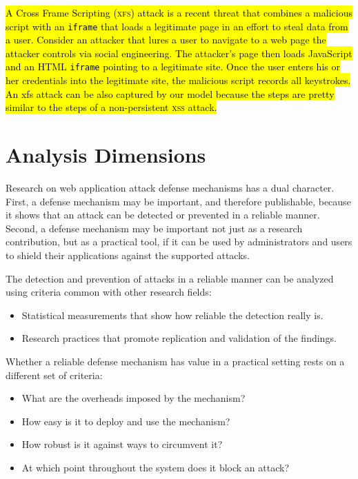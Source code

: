 \documentclass[10pt,journal,compsoc]{IEEEtran}
\newcommand{\hlc}[2][yellow]{ {\sethlcolor{#1} \hl{#2}} }
\begin{document}
\hlc[yellow]{A Cross Frame Scripting (\textsc{xfs})
attack is a recent threat that combines
a malicious script with
an {\tt iframe} that loads a legitimate page in
an effort to steal data from a user.
Consider an attacker that lures
a user to navigate to a web page the attacker controls
via social engineering.
The attacker's page then loads JavaScript
and an HTML {\tt iframe} pointing to a legitimate site.
Once the user enters his or her
credentials into the legitimate site,
the malicious script records all keystrokes.
An {\sc xfs} attack can be also captured by our model
because the steps are pretty similar to the steps of
a non-persistent \textsc{xss} attack.}

\section{Analysis Dimensions}
\label{sec:dimensions}

Research on web application attack defense mechanisms has a dual
character. First, a defense mechanism may be important, and therefore
publishable, because it shows that an attack can be detected or prevented in a
reliable manner. Second, a defense mechanism may be important not
just as a research contribution, but as a practical tool, if it can be
used by administrators and users to shield their applications
against the supported attacks.

The detection and prevention of attacks
in a reliable manner can be analyzed using
criteria common with other research fields:
\begin{itemize}
\item Statistical measurements that show how
reliable the detection really is.
\item Research practices that promote replication and validation
of the findings.
\end{itemize}

\noindent
Whether a reliable defense mechanism has value in a practical
setting rests on a different set of criteria:
\begin{itemize}
\item What are the overheads imposed by the mechanism?
\item How easy is it to deploy and use the mechanism?
\item How robust is it against ways to circumvent it?
\item At which point throughout the system does it block an attack?
\end{itemize}
\end{document}
